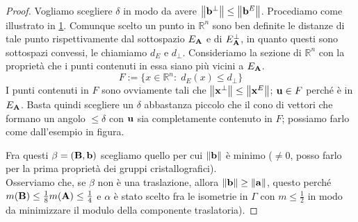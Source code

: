 \documentclass[a4paper,11pt,openright,twoside	]{book}
\begin{document}
\begin{proof}
Vogliamo scegliere $\delta$ in modo da avere $\norm{\vb{b}^{\perp}} \leq \norm{\vb{b}^E}$. 
Procediamo come illustrato in \ref{fig:ea}. 
Comunque scelto un punto in $\mathbb{R}^n$ sono ben definite le distanze di tale punto rispettivamente dal sottospazio $E_{\vb{A}}$ e di $E_{\vb{A}}^{\perp}$, in quanto questi sono sottospazi convessi, le chiamiamo $d_E$ e $d_{\perp}$. Consideriamo la sezione di $\mathbb{R}^n$ con la proprietà che i punti contenuti in essa siano più vicini a $E_{\vb{A}}$.
\[ F := \{ x \in \mathbb{R}^n : \; d_E(x) \leq d_{\perp}  \} \]
I punti contenuti in $F$ sono ovviamente tali che $\norm{\vb{x}^{\perp}} \leq \norm{\vb{x}^E}$; $\vb{u} \in F$  perché è in $E_{\vb{A}}$. 
Basta quindi scegliere un $\delta$ abbastanza piccolo che il cono di vettori che formano un angolo $\leq \delta$ con $\vb{u} $ sia completamente contenuto in $F$; possiamo farlo come dall'esempio in figura. \\
\begin{figure}[h!]
\centering
{}
\caption{}
\label{fig:ea}
\end{figure}

Fra questi $\beta = (\vb{B, b})$ scegliamo quello per cui $\norm{\vb{b}}$ è minimo ($\neq 0$, posso farlo per la prima proprietà dei gruppi cristallografici). \\
Osserviamo che, se $\beta$ non è una traslazione, allora $ \norm{\vb{b}} \geq \norm{\vb{a}}$, questo perché $m(\vb{B}) \leq \frac{1}{8}m(\vb{A}) \leq \frac{1}{4}$ e $\alpha$ è stato scelto fra le isometrie in $\Gamma$ con $m \leq \frac{1}{2}$ in modo da minimizzare il modulo della componente traslatoria).  


\end{proof}
\end{document}
